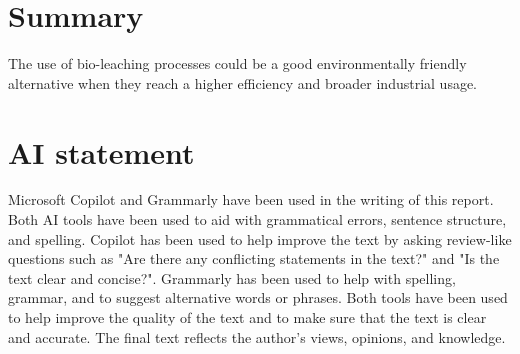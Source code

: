 \section{Summary}

The use of bio-leaching processes could be a good environmentally friendly alternative when they reach a higher efficiency and broader industrial usage.

\section{AI statement}

Microsoft Copilot and Grammarly have been used in the writing of this report. Both AI tools have been used to aid with grammatical errors, sentence structure, and spelling. Copilot has been used to help improve the text by asking review-like questions such as "Are there any conflicting statements in the text?" and "Is the text clear and concise?". Grammarly has been used to help with spelling, grammar, and to suggest alternative words or phrases. Both tools have been used to help improve the quality of the text and to make sure that the text is clear and accurate. The final text reflects the author's views, opinions, and knowledge.

